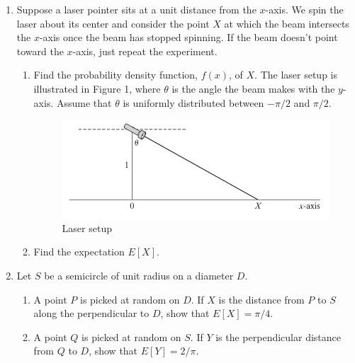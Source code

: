 \documentclass[11pt,letterpaper]{report}
\begin{document}
\begin{enumerate}
	\item Suppose a laser pointer sits at a unit distance from the $x$-axis. We spin the laser about its center and consider the point $X$ at which the beam intersects the $x$-axis once the beam has stopped spinning. If the beam doesn't point toward the $x$-axis, just repeat the experiment.
	\begin{enumerate}
		\item Find the probability density function, $f(x)$, of $X$. The laser setup is illustrated in Figure 1, where $\theta$ is the angle the beam makes with the $y$-axis. Assume that $\theta$ is uniformly distributed between $-\pi/2$ and $\pi/2$.
		\begin{figure}[h]
		\centering
			\includegraphics[scale=.6]{beam.PNG}
			\caption{Laser setup}
		\end{figure}

		\item Find the expectation $E[X]$.
	\end{enumerate}










	\item Let $S$ be a semicircle of unit radius on a diameter $D$.
	\begin{enumerate}
		\item A point $P$ is picked at random on $D$. If $X$ is the distance from $P$ to $S$ along the perpendicular to $D$, show that $E[X] = \pi/4$.
		\item A point $Q$ is picked at random on $S$. If $Y$ is the perpendicular distance from $Q$ to $D$, show that $E[Y] = 2/\pi$.
	\end{enumerate}
\end{enumerate}
\end{document}
